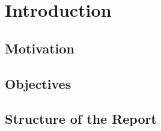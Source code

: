 \normallinespacing

\chapter{Introduction}
\section{Motivation}

\blindtext

\blindtext

\section{Objectives}
\section{Structure of the Report}


\newpage


